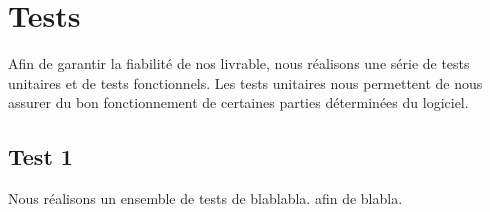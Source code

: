 \section{Tests}

Afin de garantir la fiabilité de nos livrable, nous réalisons une série de tests unitaires et de tests fonctionnels. Les tests unitaires nous permettent de nous assurer du bon fonctionnement de certaines parties déterminées du logiciel. 

\subsection{Test 1}
Nous réalisons un ensemble de tests de blablabla. afin de blabla.